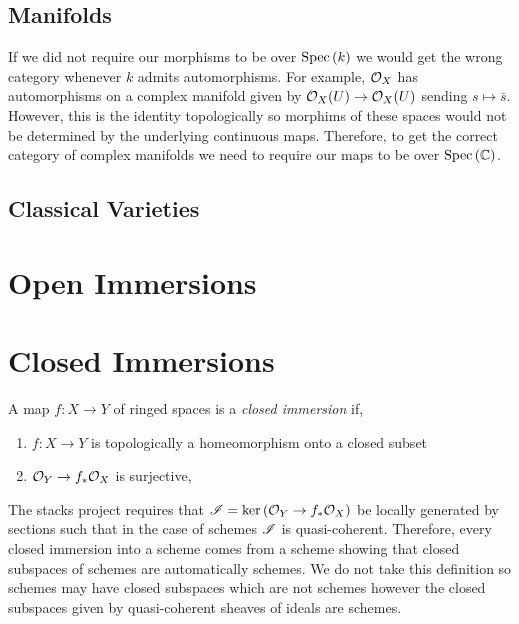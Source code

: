 \documentclass[12pt]{article}
\begin{document}
\begin{defn}

\end{defn}

\subsection{Manifolds}

\begin{rmk}
If we did not require our morphisms to be over $\mathrm{Spec}\left( k \right)$ we would get the wrong category whenever $k$ admits automorphisms. For example, $\mathcal{O}_{X}$ has automorphisms on a complex manifold given by $\mathcal{O}_{X}(U) \to \mathcal{O}_{X}(U)$ sending $s \mapsto \bar{s}$. However, this is the identity topologically so morphims of these spaces would not be determined by the underlying continuous maps. Therefore, to get the correct category of complex manifolds we need to require our maps to be over $\mathrm{Spec}\left( \mathbb{C} \right)$.
\end{rmk}

\subsection{Classical Varieties}

\section{Open Immersions}

\section{Closed Immersions}

\begin{defn}
A map $f : X \to Y$ of ringed spaces is a \textit{closed immersion} if,
\begin{enumerate}
\item $f : X \to Y$ is topologically a homeomorphism onto a closed subset
\item $\mathcal{O}_{Y} \to f_* \mathcal{O}_{X}$ is surjective,
\end{enumerate}
\end{defn}

\begin{rmk}
The stacks project requires that $\mathscr{I} = \ker{(\mathcal{O}_{Y} \to f_* \mathcal{O}_{X})}$ be locally generated by sections such that in the case of schemes $\mathscr{I}$ is quasi-coherent. Therefore, every closed immersion into a scheme comes from a scheme showing that closed subspaces of schemes are automatically schemes. We do not take this definition so schemes may have closed subspaces which are not schemes however the closed subspaces given by quasi-coherent sheaves of ideals are schemes.
\end{rmk}
\end{document}
